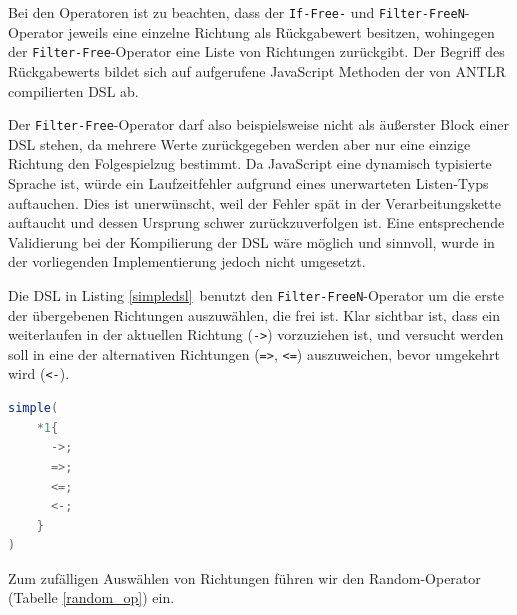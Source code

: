 \documentclass[conference]{IEEEtran}
\begin{document}
Bei den Operatoren ist zu beachten, dass der \texttt{If-Free-} und \texttt{Filter-FreeN}-Operator jeweils eine einzelne Richtung als Rückgabewert besitzen, wohingegen der \texttt{Filter-Free}-Operator eine Liste von Richtungen zurückgibt. Der Begriff des Rückgabewerts bildet sich auf aufgerufene JavaScript Methoden der von ANTLR compilierten DSL ab.

Der \texttt{Filter-Free}-Operator darf also beispielsweise nicht als äußerster Block einer DSL stehen, da mehrere Werte zurückgegeben werden aber nur eine einzige Richtung den Folgespielzug bestimmt. Da JavaScript eine dynamisch typisierte Sprache ist, würde ein Laufzeitfehler aufgrund eines unerwarteten Listen-Typs auftauchen. Dies ist unerwünscht, weil der Fehler spät in der Verarbeitungskette auftaucht und dessen Ursprung schwer zurückzuverfolgen ist. Eine entsprechende Validierung bei der Kompilierung der DSL wäre möglich und sinnvoll, wurde in der vorliegenden Implementierung jedoch nicht umgesetzt.

Die DSL in Listing \ref{simpledsl} benutzt den \texttt{Filter-FreeN}-Operator um die erste der übergebenen Richtungen auszuwählen, die frei ist. Klar sichtbar ist, dass ein weiterlaufen in der aktuellen Richtung (\texttt{->}) vorzuziehen ist, und versucht werden soll in eine der alternativen Richtungen (\texttt{=>}, \texttt{<=}) auszuweichen, bevor umgekehrt wird (\texttt{<-}).


\begin{lstlisting}[language=Java, captionpos=b, caption=AI DSL mit F\texttt{Filter-FreeN}-Operator, label=simpledsl]
simple(
    *1{
      ->;
      =>;
      <=;
      <-;
    }
)
\end{lstlisting}

Zum zufälligen Auswählen von Richtungen führen wir den Random-Operator (Tabelle \ref{random_op}) ein.
\end{document}
